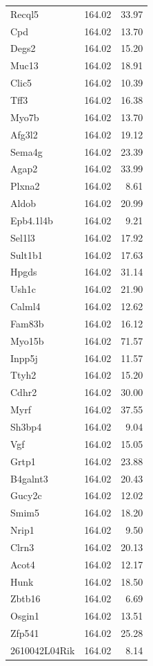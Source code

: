 \documentclass{article}
\begin{document}
\begin{longtable}{lrr}
  Recql5 & 164.02 & 33.97 \\ 
  Cpd & 164.02 & 13.70 \\ 
  Degs2 & 164.02 & 15.20 \\ 
  Muc13 & 164.02 & 18.91 \\ 
  Clic5 & 164.02 & 10.39 \\ 
  Tff3 & 164.02 & 16.38 \\ 
  Myo7b & 164.02 & 13.70 \\ 
  Afg3l2 & 164.02 & 19.12 \\ 
  Sema4g & 164.02 & 23.39 \\ 
  Agap2 & 164.02 & 33.99 \\ 
  Plxna2 & 164.02 & 8.61 \\ 
  Aldob & 164.02 & 20.99 \\ 
  Epb4.1l4b & 164.02 & 9.21 \\ 
  Sel1l3 & 164.02 & 17.92 \\ 
  Sult1b1 & 164.02 & 17.63 \\ 
  Hpgds & 164.02 & 31.14 \\ 
  Ush1c & 164.02 & 21.90 \\ 
  Calml4 & 164.02 & 12.62 \\ 
  Fam83b & 164.02 & 16.12 \\ 
  Myo15b & 164.02 & 71.57 \\ 
  Inpp5j & 164.02 & 11.57 \\ 
  Ttyh2 & 164.02 & 15.20 \\ 
  Cdhr2 & 164.02 & 30.00 \\ 
  Myrf & 164.02 & 37.55 \\ 
  Sh3bp4 & 164.02 & 9.04 \\ 
  Vgf & 164.02 & 15.05 \\ 
  Grtp1 & 164.02 & 23.88 \\ 
  B4galnt3 & 164.02 & 20.43 \\ 
  Gucy2c & 164.02 & 12.02 \\ 
  Smim5 & 164.02 & 18.20 \\ 
  Nrip1 & 164.02 & 9.50 \\ 
  Clrn3 & 164.02 & 20.13 \\ 
  Acot4 & 164.02 & 12.17 \\ 
  Hunk & 164.02 & 18.50 \\ 
  Zbtb16 & 164.02 & 6.69 \\ 
  Osgin1 & 164.02 & 13.51 \\ 
  Zfp541 & 164.02 & 25.28 \\ 
  2610042L04Rik & 164.02 & 8.14 \\ 

\end{longtable}
\end{document}

